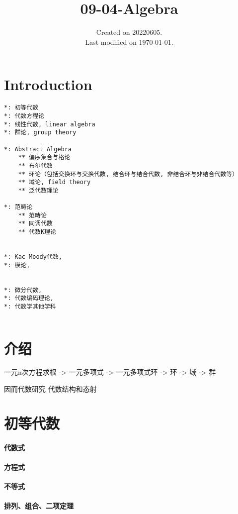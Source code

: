 \documentclass[UTF8]{../09-Mathematics}
\begin{document}
\title{09-04-Algebra}
\date{Created on 20220605.\\   Last modified on \today.}
\maketitle
\tableofcontents


\chapter{Introduction}


\begin{lstlisting}
*: 初等代数
*: 代数方程论
*: 线性代数, linear algebra
*: 群论, group theory

*: Abstract Algebra
    ** 偏序集合与格论
    ** 布尔代数
    ** 环论（包括交换环与交换代数, 结合环与结合代数, 非结合环与非结合代数等）
    ** 域论, field theory
    ** 泛代数理论

*: 范畴论
    ** 范畴论
    ** 同调代数
    ** 代数K理论


*: Kac-Moody代数,
*: 模论, 


*: 微分代数, 
*: 代数编码理论, 
*: 代数学其他学科


\end{lstlisting}



\chapter{介绍}

一元n次方程求根 -> 一元多项式 -> 一元多项式环  -> 环  -> 域 -> 群 

因而代数研究 代数结构和态射




\chapter{初等代数}
\subsubsection{代数式}
\subsubsection{方程式}
\subsubsection{不等式}
\subsubsection{排列、组合、二项定理}
\end{document}
